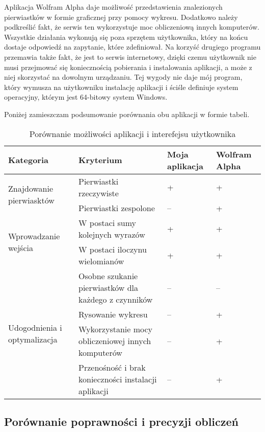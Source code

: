 Aplikacja Wolfram Alpha daje możliwość przedstawienia znalezionych pierwiastków w formie graficznej przy pomocy wykresu. Dodatkowo należy podkreślić fakt, że serwis ten wykorzystuje moc obliczeniową innych komputerów. Wszystkie działania wykonują się poza sprzętem użytkownika, który na końcu dostaje odpowiedź na zapytanie, które zdefiniował. Na korzyść drugiego programu przemawia także fakt, że jest to serwis internetowy, dzięki czemu użytkownik nie musi przejmować się koniecznością pobierania i instalowania aplikacji, a może z niej skorzystać na dowolnym urządzaniu. Tej wygody nie daje mój program, który wymusza na użytkowniku instalację aplikacji i ściśle definiuje system operacyjny, którym jest 64-bitowy system Windows.

Poniżej zamieszczam podsumowanie porównania obu aplikacji w formie tabeli.

\begin{table}[H]
	\begin{tabular}{ |p{4.7cm}|p{5.5cm}|p{1.5cm}|p{1.5cm}| } 
		\hline
		Kategoria & Kryterium & Moja aplikacja & Wolfram Alpha \\
		\hline
		\multirow{2}{*}{Znajdowanie pierwiasktów}
		& Pierwiastki rzeczywiste & + & + \\
		& Pierwiastki zespolone & -- & + \\
		\hline
		\multirow{2}{*}{Wprowadzanie wejścia}
		&W postaci sumy kolejnych wyrazów & + & + \\
		&W postaci iloczynu wielomianów & + & + \\
		\hline
		\multirow{4}{*}{Udogodnienia i optymalizacja}
		&Osobne szukanie pierwiastków dla każdego z czynników & -- & -- \\
		&Rysowanie wykresu & -- & + \\
		&Wykorzystanie mocy obliczeniowej innych komputerów & -- & + \\
		&Przenośność i brak konieczności instalacji aplikacji & -- & + \\
		\hline
	\end{tabular}
	\caption{Porównanie możliwości aplikacji i interefejsu użytkownika}
\end{table}

\subsection {Porównanie poprawności i precyzji obliczeń}

